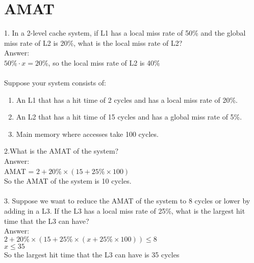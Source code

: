 \documentclass{article}
\begin{document}
\section{AMAT}
1. In a 2-level cache system, if L1 has a local miss rate of 50\% and the global miss rate of L2 is 20\%, what is the local miss rate of L2?\\
Answer:\\
$50\% \cdot x = 20\%$, so the local miss rate of L2 is 40\%
\\
\\
Suppose your system consists of:\par
\begin{enumerate}
    \item An L1 that has a hit time of 2 cycles and has a local miss rate of 20\%.
    \item An L2 that has a hit time of 15 cycles and has a global miss rate of 5\%.
    \item Main memory where accesses take 100 cycles.
\end{enumerate}
2.What is the AMAT of the system?\\
Answer:\\
AMAT = $2 + 20\% \times (15 + 25\% \times 100)$\\
So the AMAT of the system is 10 cycles.
\\
\\
3. Suppose we want to reduce the AMAT of the system to 8 cycles or lower by adding in a L3. If the L3 has a local miss rate of 25\%, what is the largest hit time that the L3 can have?\\
Answer:\\
$2 + 20\% \times (15 + 25\% \times (x + 25\% \times 100)) \leq 8$\\
$x \leq 35$\\
So the largest hit time that the L3 can have is 35 cycles\\
\end{document}
